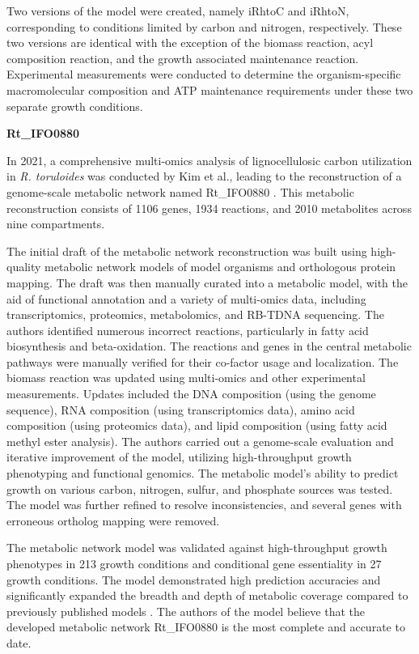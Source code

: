 Two versions of the model were created, namely iRhtoC and iRhtoN, corresponding to conditions limited by carbon and nitrogen, respectively. These two versions are identical with the exception of the biomass reaction, acyl composition reaction, and the growth associated maintenance reaction. Experimental measurements were conducted to determine the organism-specific macromolecular composition and ATP maintenance requirements under these two separate growth conditions. \cite{Dinh2019}


\textbf{Rt\_IFO0880}

In 2021, a comprehensive multi-omics analysis of lignocellulosic carbon utilization in \textit{R. toruloides} was conducted by Kim et al., leading to the reconstruction of a genome-scale metabolic network named Rt\_IFO0880 \cite{Kim2021}. This metabolic reconstruction consists of 1106 genes, 1934 reactions, and 2010 metabolites across nine compartments.

The initial draft of the metabolic network reconstruction was built using high-quality metabolic network models of model organisms and orthologous protein mapping. The draft was then manually curated into a metabolic model, with the aid of functional annotation and a variety of multi-omics data, including transcriptomics, proteomics, metabolomics, and RB-TDNA sequencing.
The authors identified numerous incorrect reactions, particularly in fatty acid biosynthesis and beta-oxidation. The reactions and genes in the central metabolic pathways were manually verified for their co-factor usage and localization. The biomass reaction was updated using multi-omics and other experimental measurements. Updates included the DNA composition (using the genome sequence), RNA composition (using transcriptomics data), amino acid composition (using proteomics data), and lipid composition (using fatty acid methyl ester analysis).
The authors carried out a genome-scale evaluation and iterative improvement of the model, utilizing high-throughput growth phenotyping and functional genomics. The metabolic model's ability to predict growth on various carbon, nitrogen, sulfur, and phosphate sources was tested. The model was further refined to resolve inconsistencies, and several genes with erroneous ortholog mapping were removed. \cite{Kim2021}
 
The metabolic network model was validated against high-throughput growth phenotypes in 213 growth conditions and conditional gene essentiality in 27 growth conditions. The model demonstrated high prediction accuracies and significantly expanded the breadth and depth of metabolic coverage compared to previously published models \cite{Dinh2019, Tiukova2019}.
The authors of the model believe that the developed metabolic network Rt\_IFO0880 is the most complete and accurate to date. \cite{Kim2021}

